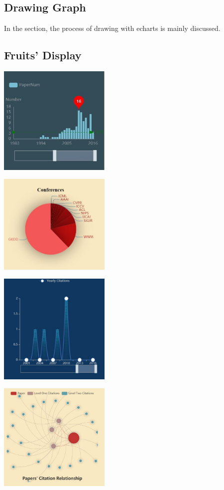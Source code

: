 \documentclass[10pt,twoside,a4paper,titlepage]{article}
\begin{document}
	\subsection{Drawing Graph}
		\par In the section, the process of drawing with echarts is mainly discussed.

	\subsection{Fruits' Display}
		\includegraphics[width=0.4\textwidth]{gjl/11.jpg}\newline\par
		\includegraphics[width=0.4\textwidth]{gjl/12.jpg}\newline\par
		\includegraphics[width=0.4\textwidth]{gjl/21.jpg}\newline\par
		\includegraphics[width=0.4\textwidth]{gjl/22.jpg}\newline\par
\end{document}

